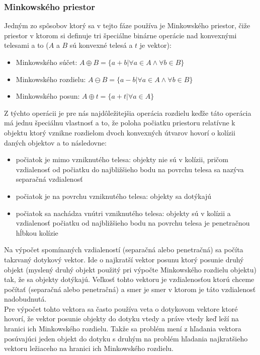 \documentclass[a4paper]{article}
\begin{document}
	\subsubsection{Minkowského priestor}
	
	Jedným zo spôsobov ktorý sa v tejto fáze používa je Minkowského priestor, čiže priestor v ktorom si definuje tri špeciálne binárne operácie nad konvexnými telesami a to ($A$ a $B$ sú konvexné telesá a $t$ je vektor): 
	\begin{itemize}
		\item Minkowského súčet: $A \oplus B = \{ a + b  | \forall a \in A \land \forall b \in B \} $
		\item Minkowského rozdielu: $A \ominus B = \{ a - b  | \forall a \in A \land \forall b \in B \} $
		\item Minkowského posun: $A \oplus t = \{ a + t  | \forall a \in A \} $
	\end{itemize}
	
	Z týchto operácii je pre nás najdôležitejšia operácia rozdielu keďže táto operácia má jednu špeciálnu vlastnosť a to, že poloha počiatku priestoru relatívne k objektu ktorý vznikne rozdielom dvoch konvexných útvarov hovorí o kolízii daných objektov a to následovne:
	
	\begin{itemize}
		\item počiatok je mimo vzniknutého telesa: objekty nie sú v kolízii, pričom vzdialenosť od počiatku do najbližšieho bodu na povrchu telesa sa nazýva separačná vzdialenosť  
		\item počiatok je na povrchu vzniknutého telesa: objekty sa dotýkajú
		\item počiatok sa nachádza vnútri vzniknutého telesa: objekty sú v kolízii a vzdialenosť počiatku od najbližšieho bodu na povrchu telesa je penetračnou hĺbkou kolízie
	\end{itemize}  
	
	Na výpočet spomínaných vzdialeností (separačná alebo penetračná) sa počíta takzvaný dotykový vektor. Ide o najkratší vektor posunu ktorý posunie druhý objekt (myslený druhý objekt použitý pri výpočte Minkowského rozdielu objektu) tak, že sa objekty dotýkajú. Veľkosť tohto vektoru je vzdialenosťou ktorú chceme počítať (separačná alebo penetračná) a smer je smer v ktorom je táto vzdialenosť nadobudnutá.
	\\
	
	Pre výpočet tohto vektora sa často používa veta o dotykovom vektore ktoré hovorí, že vektor posunie objekty do dotyku vtedy a práve vtedy keď leží na hranici ich Minkowského rozdielu. Takže sa problém mení z hľadania vektora posúvajúci jeden objekt do dotyku s druhým na problém hľadania najkratšieho vektoru ležiaceho na hranici ich Minkowského rozdielu.
	\\
	
\end{document}
